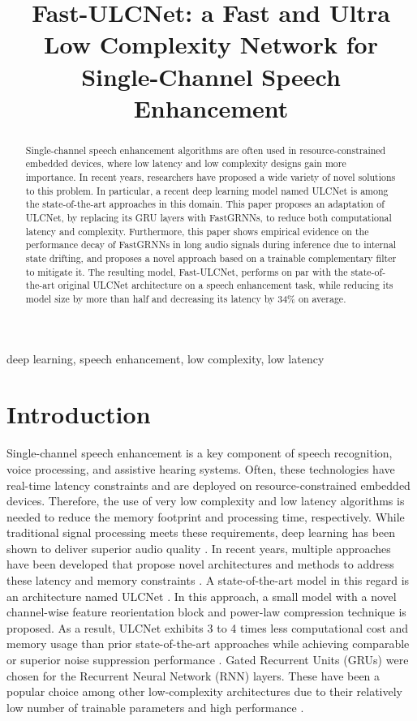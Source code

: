 \documentclass[9pt]{article}
\title{Fast-ULCNet: a Fast and Ultra Low Complexity Network for Single-Channel Speech Enhancement}
\begin{document}
%
\maketitle
%
\begin{abstract}
Single-channel speech enhancement algorithms are often used in resource-constrained embedded devices, where low latency and low complexity designs gain more importance. In recent years, researchers have proposed a wide variety of novel solutions to this problem. In particular, a recent deep learning model named ULCNet is among the state-of-the-art approaches in this domain. This paper proposes an adaptation of ULCNet, by replacing its GRU layers with FastGRNNs, to reduce both computational latency and complexity. Furthermore, this paper shows empirical evidence on the performance decay of FastGRNNs in long audio signals during inference due to internal state drifting, and proposes a novel approach based on a trainable complementary filter to mitigate it. The resulting model, Fast-ULCNet, performs on par with the state-of-the-art original ULCNet architecture on a speech enhancement task, while reducing its model size by more than half and decreasing its latency by 34\% on average.
\end{abstract}
%
\begin{keywords}
deep learning, speech enhancement, low complexity, low latency
\end{keywords}
%
\section{Introduction}
\label{sec:intro}

Single-channel speech enhancement is a key component of speech recognition, voice processing, and assistive hearing systems. Often, these technologies have real-time latency constraints and are deployed on resource-constrained embedded devices. Therefore, the use of very low complexity and low latency algorithms is needed to reduce the memory footprint and processing time, respectively. While traditional signal processing meets these requirements, deep learning has been shown to deliver superior audio quality \cite{C1}. In recent years, multiple approaches have been developed that propose novel architectures and methods to address these latency and memory constraints \cite{C2,C3,C4}. A state-of-the-art model in this regard is an architecture named ULCNet \cite{C5}. In this approach, a small model with a novel channel-wise feature reorientation block and power-law compression technique is proposed. As a result, ULCNet exhibits 3 to 4 times less computational cost and memory usage than prior state-of-the-art approaches while achieving comparable or superior noise suppression performance \cite{C5}. Gated Recurrent Units (GRUs) \cite{C6} were chosen for the Recurrent Neural Network (RNN) layers. These have been a popular choice among other low-complexity architectures \cite{C2,C3} due to their relatively low number of trainable parameters and high performance \cite{C7}.
\end{document}
